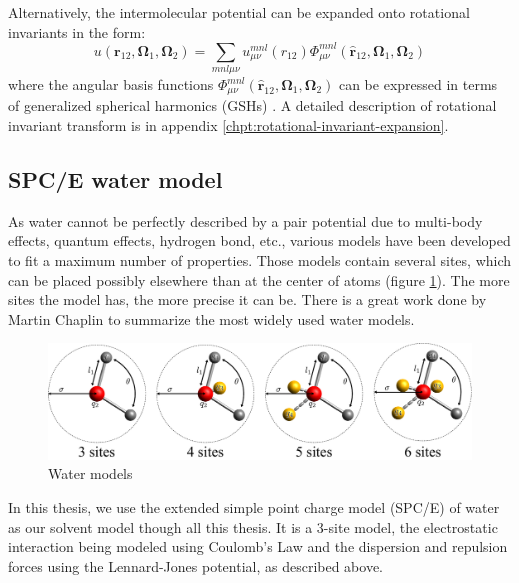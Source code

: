 Alternatively, the intermolecular potential can be expanded onto rotational
invariants in the form:
\begin{equation}
u(\mathbf{r}_{12},\mathbf{\Omega}_{1},\mathbf{\Omega}_{2})=\sum_{mnl\mu\nu}u_{\mu\nu}^{mnl}(r_{12})\Phi_{\mu\nu}^{mnl}(\hat{\mathbf{r}}_{12},\mathbf{\Omega}_{1},\mathbf{\Omega}_{2})
\end{equation}
where the angular basis functions $\Phi_{\mu\nu}^{mnl}(\hat{\mathbf{r}}_{12},\mathbf{\Omega}_{1},\mathbf{\Omega}_{2})$
can be expressed in terms of generalized spherical harmonics (\acs{GSH}s)
\citep{Gray-Gubbins}. A detailed description of rotational invariant
transform is in appendix \ref{chpt:rotational-invariant-expansion}.

\subsection{SPC/E water model}

As water cannot be perfectly described by a pair potential due to
multi-body effects, quantum effects, hydrogen bond, etc., various
models have been developed to fit a maximum number of properties.
Those models contain several sites, which can be placed possibly elsewhere
than at the center of atoms (figure \ref{fig:Water-models}). The
more sites the model has, the more precise it can be. There is a great
work done by Martin Chaplin \citep{water-model} to summarize the
most widely used water models.

\begin{figure}[h]
\begin{centering}
\includegraphics[width=0.75\columnwidth]{_figure/water}
\par\end{centering}
\caption{Water models\label{fig:Water-models}}
\end{figure}

In this thesis, we use the extended simple point charge model (SPC/E)
of water \citep{SPC/E} as our solvent model though all this thesis.
 It is a 3-site model, the electrostatic interaction being modeled
using Coulomb's Law and the dispersion and repulsion forces using
the Lennard-Jones potential, as described above.

